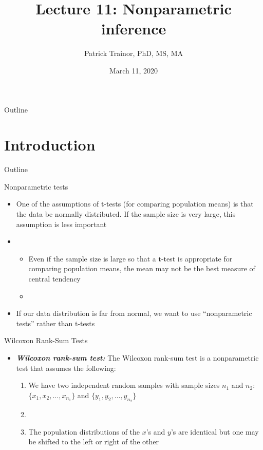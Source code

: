 \documentclass[xcolor=dvipsnames]{beamer}
\title[Lecture 11]{Lecture 11: Nonparametric inference}
\author[Patrick Trainor]{Patrick Trainor, PhD, MS, MA}
\institute[NMSU]{New Mexico State University}
\date{March 11, 2020}
\begin{document}
\begin{frame}
\maketitle
\end{frame}

\begin{frame}{Outline}
\tableofcontents[hideallsubsections]
\end{frame}

\section{Introduction}
\begin{frame}{Outline}
\tableofcontents[currentsection,subsectionstyle=show/shaded/hide]
\end{frame}

\begin{frame}{Nonparametric tests}
	\begin{itemize}
		\item One of the assumptions of t-tests (for comparing population means) is that the data be normally distributed. If the sample size is very large, this assumption is less important \pause
		\item[]
		\begin{itemize}
			\item Even if the sample size is large so that a t-test is appropriate for comparing population means, the mean may not be the best measure of central tendency \pause
			\item[]
		\end{itemize}
		\item If our data distribution is far from normal, we want to use ``nonparametric tests'' rather than t-tests 
	\end{itemize}
\end{frame}

\begin{frame}{Wilcoxon Rank-Sum Tests}
	\begin{itemize}
		\item \textbf{\emph{Wilcoxon rank-sum test:}} The Wilcoxon rank-sum test is a nonparametric test that assumes the following:  \pause
		
		\begin{enumerate}
			\item We have two independent random samples with sample sizes $n_1$ and $n_2$: $\{x_1, x_2, \hdots, x_{n_1}\}$ and $\{y_1, y_2, \hdots, y_{n_2}\}$ \pause
			\item[]
			\item The population distributions of the $x$'s and $y$'s are identical but one may be shifted to the left or right of the other
		\end{enumerate}
	\end{itemize}
\end{frame}
\end{document}
